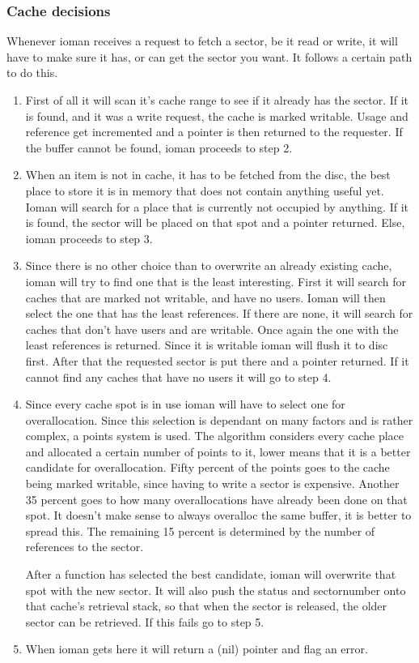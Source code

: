 \subsubsection{Cache decisions}
Whenever ioman receives a request to fetch a sector, be it read or write, it will have to make sure
it has, or can get the sector you want. It follows a certain path to do this.\label{cachemethod}
\begin{enumerate}
	\item First of all it will scan it's cache range to see if it already has the sector.
		If it is found, and it was a write request, the cache is marked writable. Usage and
		reference get incremented and a pointer	is then returned to the requester. If the
		buffer cannot be found, ioman proceeds to step 2.
	\item When an item is not in cache, it has to be fetched from the disc, the best place to
		store it is in memory that does not contain anything useful yet. Ioman will search for
		a place that is currently not occupied by anything. If it is found, the sector will be 
		placed on that spot and a pointer returned. Else, ioman proceeds to step 3.
	\item Since there is no other choice than to overwrite an already existing cache, ioman will
		try to find one that is the least interesting. First it will search for caches that
		are marked not writable, and have no users. Ioman will then select the one that has the
		least references. If there are none, it will search for caches that don't have users and
		are writable. Once again the one with the least references is returned. Since it is 
		writable ioman will flush it to disc first. After that the requested sector is put there
		and a pointer returned. If it cannot find any caches that have no users it will go to
		step 4.
	\item Since every cache spot is in use ioman will have to select one for overallocation.
		Since this selection is dependant on many factors and is rather complex, a points
		system is used. The algorithm considers every cache place and allocated a certain number
		of points to it, lower means that it is a better candidate for overallocation. Fifty 
		percent of the points goes to the cache being marked writable, since having to write
		a sector is expensive. Another 35 percent goes to how many overallocations have 
		already been done on that spot. It doesn't make sense to always overalloc the same buffer,
		it is better to spread this. The remaining 15 percent is determined by the number of 
		references to the sector. 
		
		After a function has selected the best candidate, ioman will overwrite that spot with
		the new sector. It will also push the status and sectornumber onto that cache's 
		retrieval stack, so that when the sector is released, the older sector can be retrieved.
		If this fails go to step 5.
	\item When ioman gets here it will return a (nil) pointer and flag an error.
\end{enumerate}

